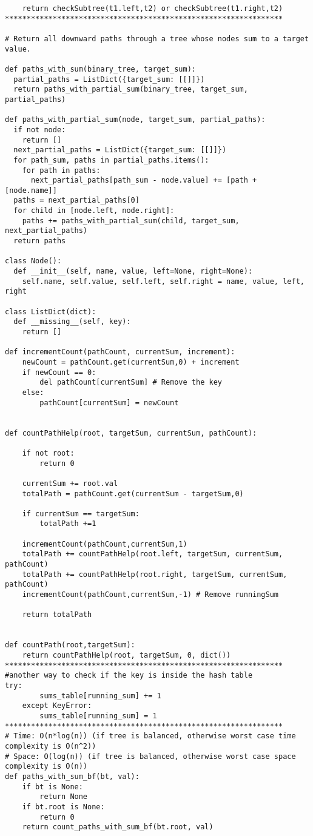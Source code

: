 \documentclass[12pt]{article}
\begin{document}
\begin{lstlisting}
	return checkSubtree(t1.left,t2) or checkSubtree(t1.right,t2)
****************************************************************

# Return all downward paths through a tree whose nodes sum to a target value.

def paths_with_sum(binary_tree, target_sum):
  partial_paths = ListDict({target_sum: [[]]})
  return paths_with_partial_sum(binary_tree, target_sum, partial_paths)
  
def paths_with_partial_sum(node, target_sum, partial_paths):
  if not node:
    return []
  next_partial_paths = ListDict({target_sum: [[]]})
  for path_sum, paths in partial_paths.items():
    for path in paths:
      next_partial_paths[path_sum - node.value] += [path + [node.name]]
  paths = next_partial_paths[0]
  for child in [node.left, node.right]:
    paths += paths_with_partial_sum(child, target_sum, next_partial_paths)
  return paths

class Node():
  def __init__(self, name, value, left=None, right=None):
    self.name, self.value, self.left, self.right = name, value, left, right

class ListDict(dict):
  def __missing__(self, key):
    return []

def incrementCount(pathCount, currentSum, increment):
	newCount = pathCount.get(currentSum,0) + increment
	if newCount == 0:
		del pathCount[currentSum] # Remove the key
	else:
		pathCount[currentSum] = newCount


def countPathHelp(root, targetSum, currentSum, pathCount):

	if not root:
		return 0

	currentSum += root.val
	totalPath = pathCount.get(currentSum - targetSum,0)

	if currentSum == targetSum:
		totalPath +=1

	incrementCount(pathCount,currentSum,1)
	totalPath += countPathHelp(root.left, targetSum, currentSum, pathCount)
	totalPath += countPathHelp(root.right, targetSum, currentSum, pathCount)
	incrementCount(pathCount,currentSum,-1) # Remove runningSum

	return totalPath


def countPath(root,targetSum):
	return countPathHelp(root, targetSum, 0, dict())
****************************************************************
#another way to check if the key is inside the hash table
try:
        sums_table[running_sum] += 1
    except KeyError:
        sums_table[running_sum] = 1
****************************************************************
# Time: O(n*log(n)) (if tree is balanced, otherwise worst case time complexity is O(n^2))
# Space: O(log(n)) (if tree is balanced, otherwise worst case space complexity is O(n)) 
def paths_with_sum_bf(bt, val):
    if bt is None:
        return None
    if bt.root is None:
        return 0
    return count_paths_with_sum_bf(bt.root, val)


\end{lstlisting}
\end{document}
